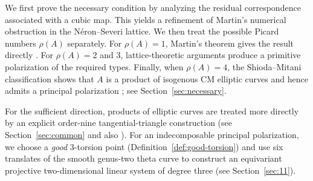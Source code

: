 \documentclass[12pt]{amsart}
\numberwithin{equation}{section}
\theoremstyle{definition}
\theoremstyle{remark}
\newcommand{\NS}{\operatorname{NS}}
\newcommand{\tr}{\operatorname{tr}}
\newcommand{\indp}{\operatorname{ind}_{+}}
\begin{document}
We first prove the necessary condition by analyzing the residual correspondence associated with a cubic map.  This yields a refinement of Martin's numerical obstruction in the N\'eron--Severi lattice.  We then treat the possible Picard numbers $\rho(A)$ separately.  For $\rho(A)=1$, Martin's theorem gives the result directly \cite[Theorem~1.1]{Martin}.  For $\rho(A)=2$ and $3$, lattice-theoretic arguments produce a primitive polarization of the required types.  Finally, when $\rho(A)=4$, the Shioda--Mitani classification shows that $A$ is a product of isogenous CM elliptic curves and hence admits a principal polarization \cite{ShiodaMitani}; see Section~\ref{sec:necessary}.

For the sufficient direction, products of elliptic curves are treated more directly by
an explicit order-nine tangential-triangle construction (see Section~\ref{sec:common} and also \cite{Lee}).  For an indecomposable principal
polarization, we choose a \emph{good} $3$-torsion point (Definition~\ref{def:good-torsion}) and
use six translates of the smooth genus-two theta curve to construct an
equivariant projective two-dimensional linear system of degree three (see Section~\ref{sec:11}).
\end{document}
